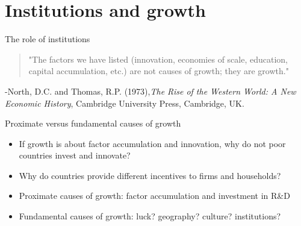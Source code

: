\documentclass[10pt,handout]{beamer}
\begin{document}
\section{Institutions and growth}


\begin{frame}{The role of institutions}
    \begin{quote}
        "The factors we have listed (innovation, economies of scale, education, capital accumulation, etc.) are not causes of growth; they are growth."
    \end{quote}\bigskip
    \begin{flushright}-North, D.C. and Thomas, R.P. (1973),\linebreak \textit{The Rise of the Western World: A New Economic History}, Cambridge University Press, Cambridge, UK.\end{flushright}
\end{frame}


\begin{frame}{Proximate versus fundamental causes of growth}
\begin{itemize}
    \item If growth is about factor accumulation and innovation, why do not poor countries invest and innovate?\medskip

    \item Why do countries provide different incentives to firms and households?\medskip

    \item Proximate causes of growth: factor accumulation and investment in R\&D\medskip

    \item Fundamental causes of growth: luck? geography? culture? institutions?\medskip
\end{itemize}
\end{frame}
\end{document}
